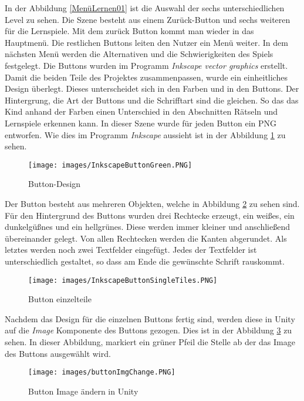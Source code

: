 In der Abbildung \ref{MenüLernen01} ist die Auswahl der sechs unterschiedlichen Level zu sehen. Die Szene besteht aus einem Zurück-Button und sechs weiteren für die Lernspiele. Mit dem zurück Button kommt man wieder in das Hauptmenü. Die restlichen Buttons leiten den Nutzer ein Menü weiter. In dem nächsten Menü werden die Alternativen und die Schwierigkeiten des Spiels festgelegt. Die Buttons wurden im Programm \textit{Inkscape vector graphics} erstellt. Damit die beiden Teile des Projektes zusammenpassen, wurde ein einheitliches Design überlegt. Dieses unterscheidet sich in den Farben und in den Buttons. Der Hintergrung, die Art der Buttons und die Schrifftart sind die gleichen. So das das Kind anhand der Farben einen Unterschied in den Abschnitten Rätseln und Lernspiele erkennen kann. In dieser Szene wurde für jeden Button ein PNG entworfen. Wie dies im Programm \textit{Inkscape} aussieht ist in der Abbildung \ref{ButtonInkscape} zu sehen.\\
\begin{figure}[htbp]
  \centering
  \texttt{[image: images/InkscapeButtonGreen.PNG]}
  \caption{Button-Design}
  \label{ButtonInkscape}
\end{figure}
Der Button besteht aus mehreren Objekten, welche in Abbildung \ref{ButtonInkscapeSingleTiles} zu sehen sind. Für den Hintergrund des Buttons wurden drei Rechtecke erzeugt, ein weißes, ein dunkelgüßnes und ein hellgrünes. Diese werden immer kleiner und anschließend übereinander gelegt. Von allen Rechtecken werden die Kanten abgerundet. Als letztes werden noch zwei Textfelder eingefügt. Jedes der Textfelder ist unterschiedlich gestaltet, so dass am Ende die gewünschte Schrift rauskommt. 
\begin{figure}[htbp]
  \centering
  \texttt{[image: images/InkscapeButtonSingleTiles.PNG]}
  \caption{Button einzelteile}
  \label{ButtonInkscapeSingleTiles}
\end{figure}
Nachdem das Design für die einzelnen Buttons fertig sind, werden diese in Unity auf die \textit{Image} Komponente des Buttons gezogen. Dies ist in der Abbildung \ref{UnityButtonImgChange} zu sehen.
In dieser Abbildung, markiert ein grüner Pfeil die Stelle ab der das Image des Buttons ausgewählt wird.
\begin{figure}[htbp]
  \centering
  \texttt{[image: images/buttonImgChange.PNG]}
  \caption{Button Image ändern in Unity}
  \label{UnityButtonImgChange}
\end{figure}
